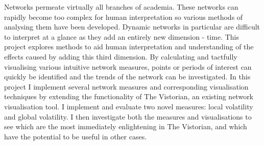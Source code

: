 

\begin{abstracts}

Networks permeate virtually all branches of academia. These networks can rapidly become too complex for human interpretation so various methods of analysing them have been developed. Dynamic networks in particular are difficult to interpret at a glance as they add an entirely new dimension - time. This project explores methods to aid human interpretation and understanding of the effects caused by adding this third dimension. By calculating and tactfully visualising various intuitive network measures, points or periods of interest can quickly be identified and the trends of the network can be investigated. In this project I implement several network measures and corresponding visualisation techniques by extending the functionality of The Vistorian, an existing network visualisation tool. I implement and evaluate two novel measures: local volatility and global volatility. I then investigate both the measures and visualisations to see which are the most immediately enlightening in The Vistorian, and which have the potential to be useful in other cases.
\end{abstracts}
